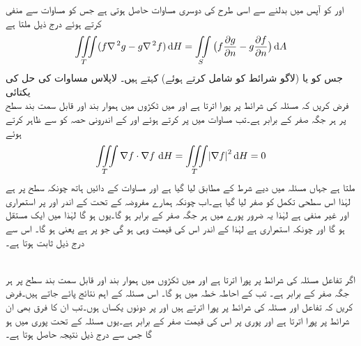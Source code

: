  اور  کو آپس میں بدلنے سے اسی طرح کی دوسری مساوات حاصل ہوتی ہے  جس کو  مساوات  سے منفی کرتے ہوئے درج ذیل ملتا ہے
\begin{align}\label{مساوات_خطی_تکمل_گرین_کلیہ_دوم}
\iiint\limits_T (f\nabla^{\,2}g-g\nabla^{\,2}f)\dif H=\iint\limits_S \big(f\frac{\partial g}{\partial n}-g\frac{\partial f}{\partial n}\big)\dif A
\end{align} 
جس کو  یا (لاگو شرائط کو شامل کرتے ہوئے)  کہتے ہیں۔
\quad لاپلاس مساوات کی حل کی یکتائی\\
فرض کریں کہ  مسئلہ  کی شرائط پر پورا اترتا ہے اور  میں ٹکڑوں میں ہموار بند اور قابل سمت بند سطح  پر ہر جگہ صفر کے برابر ہے۔تب مساوات  میں  پر کرتے ہوئے اور  کے اندرونی حصہ کو  سے ظاہر کرتے ہوئے
\begin{align*}
\iiint\limits_T \nabla f\cdot \nabla f\, \dif H=\iiint\limits_T \abs{\nabla f}^2\dif H=0
\end{align*}
ملتا ہے جہاں مسئلہ  میں دیے شرط کے مطابق  لیا گیا ہے اور مساوات  کے دائیں ہاتھ چونکہ سطح  پر  ہے لہٰذا اس سطحی تکمل کو صفر لیا گیا ہے۔اب چونکہ ہمارے مفروضہ کے تحت   کے اندر  اور  پر  استمراری اور غیر منفی  ہے لہٰذا یہ ضرور پورے  میں  ہر جگہ صفر کے برابر ہو گا۔یوں  ہو گا لہٰذا  میں  ایک مستقل ہو گا اور چونکہ  استمراری ہے لہٰذا  کے اندر اس کی قیمت وہی ہو گی جو  پر ہے یعنی  ہو گا۔
اس سے درج ذیل ثابت ہوتا ہے۔

\\
اگر تفاعل  مسئلہ  کی شرائط پر پورا اترتا ہے اور  میں ٹکڑوں میں ہموار بند اور قابل سمت بند سطح  پر ہر جگہ صفر کے برابر ہے۔ تب  کے احاطہ  خطہ  میں  ہو گا۔
اس مسئلہ کے اہم نتائج پائے جاتے ہیں۔فرض کریں کہ تفاعل  اور  مسئلہ  کی شرائط پر پورا اترتے ہیں اور  پر دونوں یکساں ہوں۔تب ان کا فرق  بھی ان شرائط پر پورا اترتا ہے  اور پوری  پر اس کی قیمت صفر کے برابر ہے۔یوں مسئلہ   کے تحت پوری  میں  ہو گا جس سے درج ذیل نتیجہ حاصل ہوتا ہے۔

